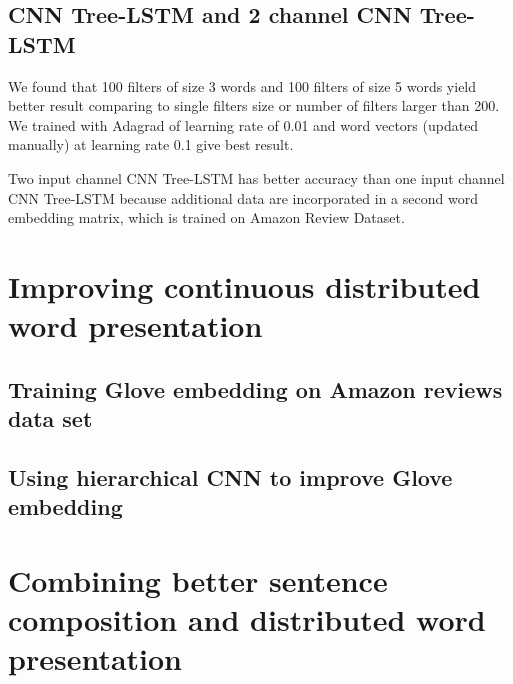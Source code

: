 \subsection{CNN Tree-LSTM and 2 channel CNN Tree-LSTM}
We found that 100 filters of size 3 words and 100 filters of size 5 words yield better result comparing to single filters size or number of filters larger than 200. We trained with Adagrad of learning rate of 0.01 and word vectors (updated manually) at learning rate 0.1 give best result.

Two input channel CNN Tree-LSTM has better accuracy than one input channel CNN Tree-LSTM because additional data are incorporated in a second word embedding matrix, which is trained on Amazon Review Dataset.









\section{Improving continuous distributed word presentation}

\subsection{Training Glove embedding on Amazon reviews data set}

\subsection{Using hierarchical CNN to improve Glove embedding}


\section{Combining better sentence composition and distributed word presentation}
